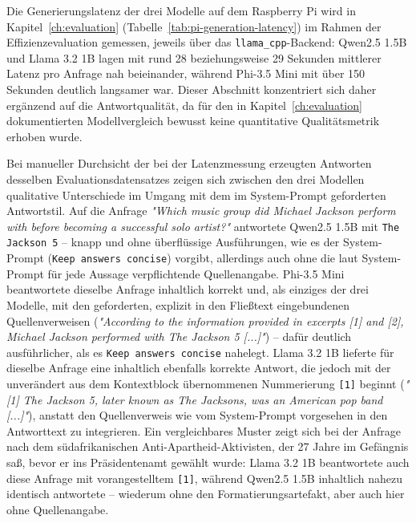 Die Generierungslatenz der drei Modelle auf dem Raspberry Pi wird in
Kapitel~\ref{ch:evaluation} (Tabelle~\ref{tab:pi-generation-latency}) im Rahmen
der Effizienzevaluation gemessen, jeweils über das \texttt{llama\_cpp}-Backend:
Qwen2.5 1.5B und Llama 3.2 1B lagen mit rund 28 beziehungsweise 29 Sekunden
mittlerer Latenz pro Anfrage nah beieinander, während Phi-3.5 Mini mit über
150 Sekunden deutlich langsamer war. Dieser Abschnitt konzentriert sich daher ergänzend auf die
Antwortqualität, da für den in Kapitel~\ref{ch:evaluation} dokumentierten
Modellvergleich bewusst keine quantitative Qualitätsmetrik erhoben wurde.

Bei manueller Durchsicht der bei der Latenzmessung erzeugten Antworten desselben
Evaluationsdatensatzes zeigen sich zwischen den drei Modellen qualitative
Unterschiede im Umgang mit dem im System-Prompt geforderten Antwortstil. Auf die
Anfrage \textit{"Which music group did Michael Jackson perform with before becoming a
successful solo artist?"} antwortete Qwen2.5 1.5B mit \texttt{The Jackson 5} -- knapp
und ohne überflüssige Ausführungen, wie es der System-Prompt (\texttt{Keep answers
concise}) vorgibt, allerdings auch ohne die laut System-Prompt für jede Aussage
verpflichtende Quellenangabe. Phi-3.5 Mini beantwortete dieselbe Anfrage inhaltlich
korrekt und, als einziges der drei Modelle, mit den geforderten, explizit in den
Fließtext eingebundenen Quellenverweisen (\textit{"According to the information
provided in excerpts [1] and [2], Michael Jackson performed with The Jackson 5
[...]"}) -- dafür deutlich ausführlicher, als es \texttt{Keep answers concise}
nahelegt. Llama 3.2 1B lieferte für dieselbe Anfrage eine inhaltlich ebenfalls
korrekte Antwort, die jedoch mit der unverändert aus dem Kontextblock übernommenen
Nummerierung \texttt{[1]} beginnt (\textit{"[1] The Jackson 5, later known as The
Jacksons, was an American pop band [...]"}), anstatt den Quellenverweis wie vom
System-Prompt vorgesehen in den Antworttext zu integrieren. Ein vergleichbares Muster
zeigt sich bei der Anfrage nach dem südafrikanischen Anti-Apartheid-Aktivisten, der 27
Jahre im Gefängnis saß, bevor er ins Präsidentenamt gewählt wurde: Llama 3.2 1B
beantwortete auch diese Anfrage mit vorangestelltem \texttt{[1]}, während Qwen2.5 1.5B
inhaltlich nahezu identisch antwortete -- wiederum ohne den Formatierungsartefakt,
aber auch hier ohne Quellenangabe.


